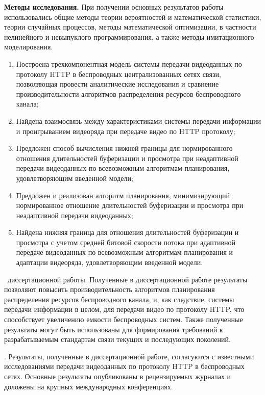 \textbf{Методы исследования.} При получении основных результатов работы использовались общие методы теории вероятностей и математической статистики, теории случайных процессов, методы математической оптимизации, в частности нелинейного и невыпуклого программирования, а также методы имитационного моделирования.

\novelty
\begin{enumerate}
    \item Построена трехкомпонентная модель системы передачи видеоданных по протоколу HTTP в беспроводных централизованных сетях связи, позволяющая провести аналитические исследования и сравнение производительности алгоритмов распределения ресурсов беспроводного канала;
    \item Найдена взаимосвязь между характеристиками системы передачи информации и проигрыванием видеоряда при передаче видео по HTTP протоколу;
    \item Предложен способ вычисления нижней границы для нормированного отношения длительностей буферизации и просмотра при неадаптивной передачи видеоданных по всевозможным алгоритмам планирования, удовлетворяющим введенной модели;
    \item Предложен и реализован алгоритм планирования, минимизирующий нормированное отношение длительностей буферизации и просмотра при неадаптивной передачи видеоданных;
    \item Найдена нижняя граница для отношения длительностей буферизации и просмотра с учетом средней битовой скорости потока при адаптивной передаче видеоданных по всевозможным алгоритмам планирования и адаптации видеоряда, удовлетворяющим введенной модели.
\end{enumerate}

\influence\ диссертационной работы. Полученные в диссертационной работе результаты позволяют повысить производительность алгоритмов планирования распределения ресурсов беспроводного канала, и, как следствие, системы передачи информации в целом, для передачи видео по протоколу HTTP, что способствует увеличению емкости беспроводных систем. Также полученные результаты могут быть использованы для формирования требований к разрабатываемым стандартам связи текущих и последующих поколений.

\reliability. Результаты, полученные в диссертационной работе, согласуются с известными исследованиями передачи видеоданных по протоколу HTTP в беспроводных сетях. Основные результаты опубликованы в рецензируемых журналах и доложены на крупных международных конференциях.

